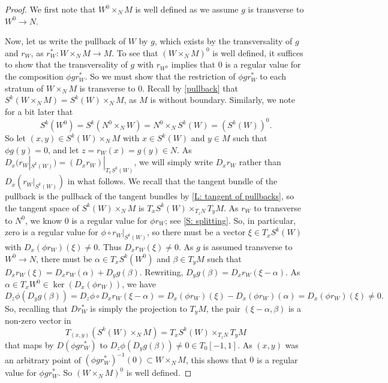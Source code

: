 \begin{proof}
	We first note that $W^0 \times_N M$ is well defined as we assume $g$ is transverse to $W^0 \to N$.

	Now, let us write the pullback of $W$ by $g$, which exists by the transversality of $g$ and $r_W$, as $r_W^* \colon W \times_N M \to M$.
	To see that $(W \times_N M)^0$ is well defined, it suffices to show that the transversality of $g$ with $r_{W^0}$ implies that $0$ is a regular value for the composition $\phi g r_W^*$.
	So we must show that the restriction of $\phi gr_W^*$ to each stratum of $W \times_N M$ is transverse to $0$.
	Recall by \cref{pullback} that $S^k(W \times_N M) = S^k(W) \times_N M$, as $M$ is without boundary.
	Similarly, we note for a bit later that $$S^k(W^0) = S^k(N^0 \times_N W) = N^0 \times_N S^k(W) = (S^k(W))^0.$$
	So let $(x,y) \in S^k(W) \times_N M$ with $x \in S^k(W)$ and $y \in M$ such that $\phi g(y)=0$, and let $z = r_W(x) = g(y) \in N$.
	As $D_x(r_W|_{S^k(W)}) = (D_xr_W)|_{T_xS^k(W)}$, we will simply write $D_xr_W$ rather than $D_x(r_W|_{S^k(W)})$ in what follows.
	We recall that the tangent bundle of the pullback is the pullback of the tangent bundles by \cref{L: tangent of pullbacks}, so the tangent space of $S^k(W) \times_N M$ is $T_x S^k(W) \times_{T_{z}N} T_yM$.
	As $r_W$ to transverse to $N^0$, we know $0$ is a regular value for $\phi r_W$; see \cref{S: splitting}.
	So, in particular, zero is a regular value for $\phi \circ r_W|_{S^k(W)}$, so there must be a vector $\xi \in T_xS^k(W)$ with $D_x(\phi r_W)(\xi)\neq 0$.
	Thus $D_xr_W(\xi) \neq 0$.
	As $g$ is assumed transverse to $W^0 \to N$, there must be $\alpha \in T_xS^k(W^0)$ and $\beta \in T_yM$ such that $D_xr_W(\xi) = D_xr_W(\alpha) + D_yg (\beta)$.
	Rewriting, $D_yg (\beta) = D_xr_W(\xi-\alpha)$.
	As $\alpha \in T_xW^0 \in \ker(D_x (\phi r_W))$, we have $$D_{z}\phi(D_yg (\beta)) = D_{z}\phi \circ D_xr_W(\xi-\alpha) = D_x(\phi r_W)(\xi)-D_x(\phi r_W)(\alpha) = D_x(\phi r_W)(\xi)\neq 0.$$
	So, recalling that $Dr_W^*$ is simply the projection to $T_yM$, the pair $( \xi-\alpha, \beta)$ is a non-zero vector in $$T_{(x,y)}(S^k(W) \times_N M) = T_x S^k(W) \times_{T_{z}N} T_yM$$ that maps by $D(\phi gr_W^*)$ to $D_{z}\phi(D_yg (\beta)) \neq 0 \in T_{0}[-1,1]$.
	As $(x,y)$ was an arbitrary point of $(\phi gr^*_{W})^{-1}(0) \subset W \times_N M$, this shows that $0$ is a regular value for $\phi gr^*_W$.
	So $(W \times_N M)^0$ is well defined.


\end{proof}
